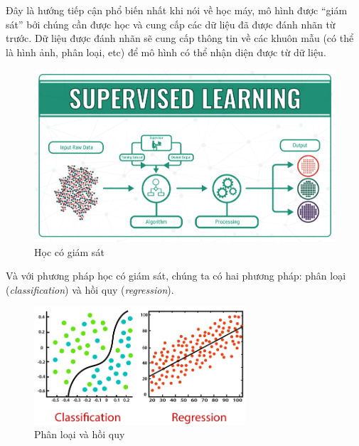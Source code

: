 Đây là hướng tiếp cận phổ biến nhất khi nói về học máy, mô hình được “giám sát” bởi chúng cần được học và cung cấp các dữ liệu đã được đánh nhãn từ trước. Dữ liệu được đánh nhãn sẽ cung cấp thông tin về các khuôn mẫu (có thể là hình ảnh, phân loại, etc) để mô hình có thể nhận diện được từ dữ liệu.\cite{webpage}

\newpage %
\begin{figure}[htb]
    \centering
    \includegraphics[width=\textwidth]{image/supervised-learning.png}
    \caption[Học có giám sát]{Học có giám sát\footnotemark}
    \label{figure:supervised-learning}
\end{figure}

Và với phương pháp học có giám sát, chúng ta có hai phương pháp: phân loại (\textit{classification}) và hồi quy (\textit{regression}).
\begin{figure}[htb]
    \centering
    \includegraphics[width=0.7\textwidth]{image/regression-vs-classification-in-machine-learning.png}
    \caption[Phân loại và hồi quy]{Phân loại và hồi quy\footnotemark}
    \label{figure:regression-vs-classification-in-machine-learning}
\end{figure}

